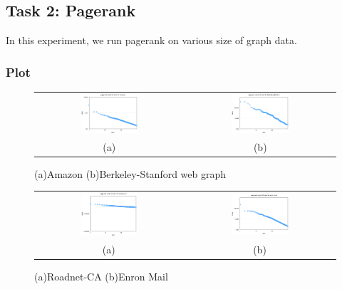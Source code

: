 \subsection{Task 2: Pagerank}
In this experiment, we run pagerank on various size of graph data.

\subsubsection{Plot}

\begin{figure}[h]
\begin{center}
\begin{tabular}{cc}
     \includegraphics[width=0.4\textwidth]{FIG/t2_amazon.png} &
     \includegraphics[width=0.4\textwidth]{FIG/t2_berke.png} \\
    (a) & (b) 
\end{tabular}
\caption{(a)Amazon (b)Berkeley-Stanford web graph}
\label{t2:1}
\end{center}
\end{figure}

\begin{figure}[h]
\begin{center}
\begin{tabular}{cc}
     \includegraphics[width=0.4\textwidth]{FIG/t2_ca.png} &
     \includegraphics[width=0.4\textwidth]{FIG/t2_enron.png} \\
    (a) & (b) 
\end{tabular}
\caption{(a)Roadnet-CA (b)Enron Mail}
\label{t2:2}
\end{center}
\end{figure}

